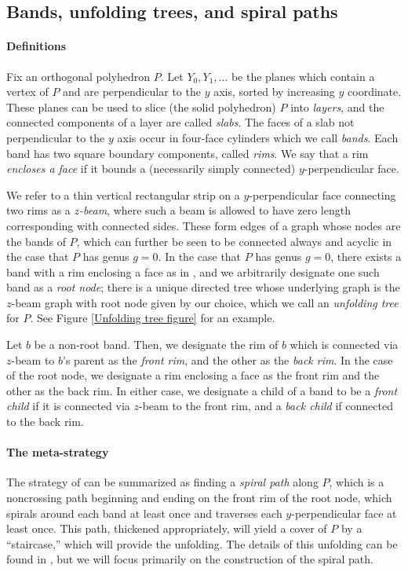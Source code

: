 \documentclass{article}
\begin{document}
\subsection{Bands, unfolding trees, and spiral paths}\label{Nonlinear definitions subsection}
\paragraph{Definitions}
Fix an orthogonal polyhedron $P$.
Let $Y_0,Y_1,\dots$ be the planes which contain a vertex of $P$ and are perpendicular to the $y$ axis, sorted by increasing $y$ coordinate.
These planes can be used to slice (the solid polyhedron) $P$ into \emph{layers}, and the connected components of a layer are called \emph{slabs}.
The faces of a slab not perpendicular to the $y$ axis occur in four-face cylinders which we call \emph{bands}.
Each band has two square boundary components, called \emph{rims}.
We say that a rim \emph{encloses a face} if it bounds a (necessarily simply connected) $y$-perpendicular face.

We refer to a thin vertical rectangular strip on a $y$-perpendicular face connecting two rims as a \emph{$z$-beam}, where such a beam is allowed to have zero length corresponding with connected sides.
These form edges of a graph whose nodes are the bands of $P$, which can further be seen to be connected always and acyclic in the case that $P$ has genus $g = 0$.
In the case that $P$ has genus $g = 0$, there exists a band with a rim enclosing a face as in \cite{Damian_Demaine}, and we arbitrarily designate one such band as a \emph{root node};
there is a unique directed tree whose underlying graph is the $z$-beam graph with root node given by our choice, which we call an \emph{unfolding tree} for $P$.
See Figure \ref{Unfolding tree figure} for an example.


Let $b$ be a non-root band.
Then, we designate the rim of $b$ which is connected via $z$-beam to $b$'s parent as the \emph{front rim}, and the other as the \emph{back rim}.
In the case of the root node, we designate a rim enclosing a face as the front rim and the other as the back rim.
In either case, we designate a child of a band to be a \emph{front child} if it is connected via $z$-beam to the front rim, and a \emph{back child} if connected to the back rim.

\paragraph{The meta-strategy}
The strategy of \cite{Damian_Flatland_Orourke,Damian_Demaine,Damian_Demaine_Flatland,Chang_Yen} can be summarized as finding a \emph{spiral path} along $P$, which is a noncrossing path beginning and ending on the front rim of the root node, which spirals around each band at least once and traverses each $y$-perpendicular face at least once.
This path, thickened appropriately, will yield a cover of $P$ by a ``staircase,'' which will provide the unfolding.
The details of this unfolding can be found in \cite{Damian_Flatland_Orourke}, but we will focus primarily on the construction of the spiral path.
\end{document}
